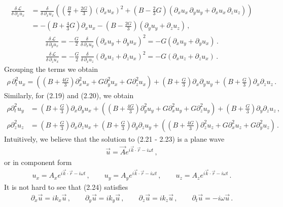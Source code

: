 \documentclass[11pt, onesided]{book}
\theoremstyle{break}
\theoremstyle{break}
\newcommand{\pd}{\partial}
\begin{document}
\begin{align*}
\frac{\delta\,\mathcal{L}}{\delta\, \pd_x u_x} &= \frac{\delta}{\delta\, \pd_xu_x}\left( 
\left( \frac{B}{2}+\frac{2G}{3}\right) (\pd_xu_x)^2 + \left( B - \frac{2}{3}G\right) \left( \pd_xu_x\,\pd_y u_y + \pd_xu_x\,\pd_zu_z \right)\right)\\
&= -\left( B + \frac{4}{3}G\right) \pd_xu_x - \left( B - \frac{2G}{3}\right) \left( \pd_y u_y + \pd_zu_z\right)\,,
\end{align*}
\begin{align*}
\frac{\delta\,\mathcal{L}}{\delta\, \pd_yu_x} = -\frac{G}{2}\, \frac{\delta}{\delta\, \pd_xu_y}\left(\pd_xu_y + \pd_y u_x \right)^2 = -G\left( \pd_xu_y + \pd_y u_x\right)\,.
\end{align*}
\begin{align*}
\frac{\delta\,\mathcal{L}}{\delta\, \pd_zu_x} = -\frac{G}{2}\, \frac{\delta}{\delta\, \pd_xu_z}\left(\pd_xu_z + \pd_z u_x \right)^2 = -G\left( \pd_xu_z + \pd_z u_x\right)\,.
\end{align*}
Grouping the terms we obtain
\begin{align}
\rho\,\pd_t^2 u_x=
\left( \left( B + \frac{4G}{3}\right) \pd_x^2u_x + G\pd_y^2u_x + G\pd_z^2u_x\right) 
+\left(B + \frac{G}{3}\right) \pd_x\pd_yu_y  
+\left( B + \frac{G}{3}\right) \pd_x\pd_zu_z\,.
\end{align}
Similarly, for (2.19) and (2.20), we obtain
\begin{align}
\rho\pd_t^2u_y &=
\left( B + \frac{G}{3}\right) \pd_x\pd_yu_x 
+\left(\left( B + \frac{4G}{3}\right) \pd_y^2u_y + G\pd_x^2u_y + G\pd_z^2u_y\right) 
+\left(B + \frac{G}{3}\right)\pd_y\pd_zu_z\,, \\
\rho\pd_z^2u_z &=
\left(B+ \frac{G}{3}\right) \pd_x\pd_zu_x 
+\left(B+\frac{G}{3}\right) \pd_y \pd_z u_y
+\left(\left(B+ \frac{4G}{3}\right)\pd_z^2u_z + G\pd_x^2u_z+ G\pd_y^2u_z\right)\,.
\end{align}
Intuitively, we believe that the solution to (2.21 - 2.23) is a plane wave
\begin{align}
\vec{u} = \vec{A}e^{i\vec{k}\cdot \vec{r} - i\omega t}\,,
\end{align}
or in component form
\begin{align*}
u_x = A_x e^{i\vec{k}\cdot \vec{r} - i\omega t}\,,\qquad
u_y = A_y e^{i\vec{k}\cdot \vec{r} - i\omega t}\,,\qquad
u_z = A_z e^{i\vec{k}\cdot \vec{r} - i\omega t}\,.
\end{align*}
It is not hard to see that (2.24) satisfies
\begin{align*}
\pd_x\vec{u} = ik_x \vec{u}\,,\qquad
\pd_y\vec{u} = ik_y \vec{u}\,,\qquad
\pd_z\vec{u} = ik_z \vec{u}\,,\qquad
\pd_t \vec{u} = -i\omega \vec{u}\,.
\end{align*}
\end{document}
